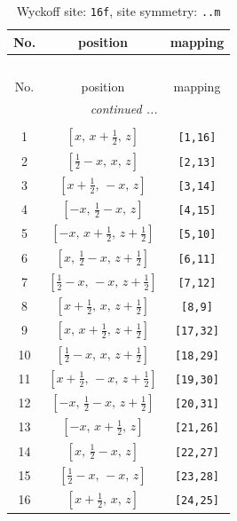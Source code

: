 \documentclass[fleqn,8pt]{jsarticle}
\begin{document}
\renewcommand{\arraystretch}{1.2}
\begin{longtable}{ccc}
\caption{Wyckoff site: {\tt 16f}, site symmetry: {\tt ..m}}
 \\
 \hline \hline
No. & position & mapping \\ \hline \endfirsthead

\multicolumn{2}{l}{\tablename\ \thetable{}} \\
 \hline \hline
No. & position & mapping \\ \hline \endhead

 \hline \hline
\multicolumn{2}{r}{\footnotesize\it continued ...} \\ \endfoot

 \hline \hline
\multicolumn{2}{r}{} \\ \endlastfoot

1 & $\left[ x,\, x + \frac{1}{2},\, z \right]$ & {\tt [1,16]} \\ \hline
2 & $\left[ \frac{1}{2} - x,\, x,\, z \right]$ & {\tt [2,13]} \\ \hline
3 & $\left[ x + \frac{1}{2},\, - x,\, z \right]$ & {\tt [3,14]} \\ \hline
4 & $\left[ - x,\, \frac{1}{2} - x,\, z \right]$ & {\tt [4,15]} \\ \hline
5 & $\left[ - x,\, x + \frac{1}{2},\, z + \frac{1}{2} \right]$ & {\tt [5,10]} \\ \hline
6 & $\left[ x,\, \frac{1}{2} - x,\, z + \frac{1}{2} \right]$ & {\tt [6,11]} \\ \hline
7 & $\left[ \frac{1}{2} - x,\, - x,\, z + \frac{1}{2} \right]$ & {\tt [7,12]} \\ \hline
8 & $\left[ x + \frac{1}{2},\, x,\, z + \frac{1}{2} \right]$ & {\tt [8,9]} \\ \hline
9 & $\left[ x,\, x + \frac{1}{2},\, z + \frac{1}{2} \right]$ & {\tt [17,32]} \\ \hline
10 & $\left[ \frac{1}{2} - x,\, x,\, z + \frac{1}{2} \right]$ & {\tt [18,29]} \\ \hline
11 & $\left[ x + \frac{1}{2},\, - x,\, z + \frac{1}{2} \right]$ & {\tt [19,30]} \\ \hline
12 & $\left[ - x,\, \frac{1}{2} - x,\, z + \frac{1}{2} \right]$ & {\tt [20,31]} \\ \hline
13 & $\left[ - x,\, x + \frac{1}{2},\, z \right]$ & {\tt [21,26]} \\ \hline
14 & $\left[ x,\, \frac{1}{2} - x,\, z \right]$ & {\tt [22,27]} \\ \hline
15 & $\left[ \frac{1}{2} - x,\, - x,\, z \right]$ & {\tt [23,28]} \\ \hline
16 & $\left[ x + \frac{1}{2},\, x,\, z \right]$ & {\tt [24,25]} \\
\end{longtable}
\end{document}
